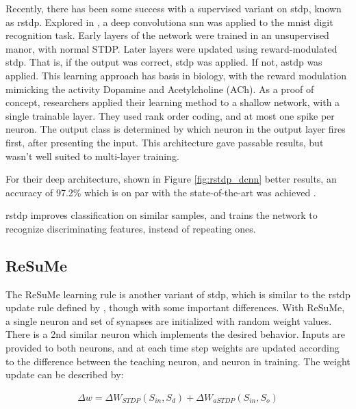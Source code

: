     Recently, there has been some success with a supervised variant on
    \Gls{stdp}, known as \gls{rstdp}. Explored in \parencite{mozafari_2018}, a
    deep convolutiona \gls{snn} was applied to the \Gls{mnist} digit recognition
    task. Early layers of the network were trained in an unsupervised manor,
    with normal STDP. Later layers were updated using reward-modulated
    \gls{stdp}. That is, if the output was correct, \Gls{stdp} was applied. If
    not, \gls{astdp} was applied. This learning approach has basis in biology,
    with the reward modulation mimicking the activity Dopamine and Acetylcholine
    (ACh). As a proof of concept, researchers applied their learning method to a
    shallow network, with a single trainable layer. They used rank order coding,
    and at most one spike per neuron. The output class is determined by which
    neuron in the output layer fires first, after presenting the input. This
    architecture gave passable results, but wasn't well suited to multi-layer
    training.
    
    For their deep architecture, shown in Figure \ref{fig:rstdp_dcnn} better
    results, an accuracy of 97.2\% which is on par with the state-of-the-art was
    achieved \parencite{mozafari_2018}.
    

    \gls{rstdp} improves classification on similar samples, and trains the network to
    recognize discriminating features, instead of repeating ones.

    \subsection{ReSuMe}
    The ReSuMe learning rule is another variant of \gls{stdp}, which is similar
    to the \gls{rstdp} update rule defined by \parencite{mozafari_2018}, though with some
    important differences. With ReSuMe, a single neuron and set of synapses are
    initialized with random weight values. There is a 2nd similar neuron
    which implements the desired behavior. Inputs are provided to both neurons,
    and at each time step weights are updated according to the difference
    between the teaching neuron, and neuron in training. The weight update can
    be described by:

    \begin{align}
      \Delta w = \Delta W_{STDP}(S_{in}, S_{d}) + \Delta W_{aSTDP}(S_{in}, S_{o}) \label{eq:resume_stdp}
    \end{align}

